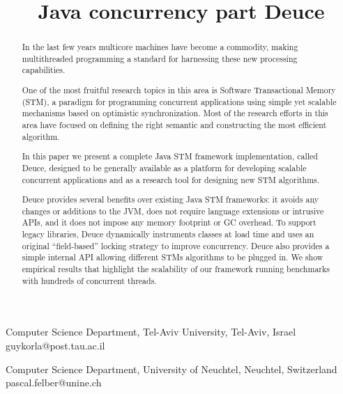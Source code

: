 \documentclass[preprint,natbib,10pt]{sigplanconf}
\begin{document}
\copyrightdata{[to be supplied]} 


\title{Java concurrency part Deuce}

           {Computer Science Department, Tel-Aviv University, Tel-Aviv, Israel}
           {guykorla@post.tau.ac.il}

           {Computer Science Department, University of Neuchtel, Neuchtel, Switzerland} 
	   {pascal.felber@unine.ch}

\maketitle

\begin{abstract}

In the last few years multicore machines have become a commodity, making multithreaded programming a standard for harnessing these new processing capabilities. 

One of the most fruitful research topics in this area is Software Transactional Memory (STM), a paradigm for programming concurrent applications using simple yet scalable mechanisms based on optimistic synchronization. Most of the research efforts in this area have focused on defining the right semantic and constructing the most efficient algorithm.

In this paper we present a complete Java STM framework implementation, called Deuce, designed to be generally available as a platform for developing scalable concurrent applications and as a research tool for designing new STM algorithms.

Deuce provides several benefits over existing Java STM frameworks: it avoids any changes or additions to the JVM, does not require language extensions or intrusive APIs, and it does not impose any memory footprint or GC overhead. To support legacy libraries, Deuce dynamically instruments classes at load time and uses an original ``field-based'' locking strategy to improve concurrency. Deuce also provides a simple internal API allowing different STMs algorithms to be plugged in. We show empirical results that highlight the scalability of our framework running benchmarks with hundreds of concurrent threads.
\end{abstract}
\end{document}
